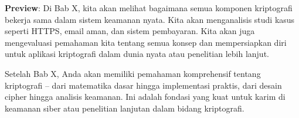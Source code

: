 \documentclass[main.tex]{subfiles}
\begin{document}
\begin{transition}
\textbf{Preview}: Di Bab X, kita akan melihat bagaimana semua komponen kriptografi bekerja sama dalam sistem keamanan nyata. Kita akan menganalisis studi kasus seperti HTTPS, email aman, dan sistem pembayaran. Kita akan juga mengevaluasi pemahaman kita tentang semua konsep dan mempersiapkan diri untuk aplikasi kriptografi dalam dunia nyata atau penelitian lebih lanjut.

Setelah Bab X, Anda akan memiliki pemahaman komprehensif tentang kriptografi $\text{--}$ dari matematika dasar hingga implementasi praktis, dari desain cipher hingga analisis keamanan. Ini adalah fondasi yang kuat untuk karim di keamanan siber atau penelitian lanjutan dalam bidang kriptografi.
\end{transition}

\ifSubfilesClassLoaded{
  \renewcommand{\bibname}{Daftar Pustaka}
  
  
}{}
\end{document}
